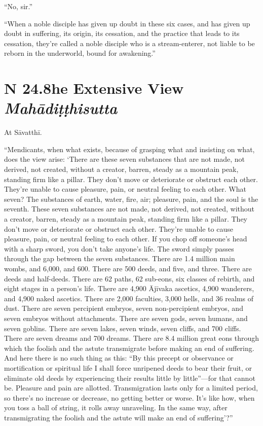 \documentclass[12pt,openany]{book}%
\newcommand*{\suttatitleacronym}[1]{\smaller[2]{#1}\vspace*{.3em}}
\newcommand*{\suttatitletranslation}[1]{\linebreak{#1}}
\newcommand*{\suttatitleroot}[1]{\linebreak\smaller[2]\itshape{#1}}
\newcommand*{\tocacronym}[1]{\hspace*{-3.3em}{#1}\quad}
\newcommand*{\toctranslation}[1]{#1}
\newcommand*{\tocroot}[1]{(\textit{#1})}
\begin{document}
“No, sir.” 

“When a noble disciple has given up doubt in these six cases, and has given up doubt in suffering, its origin, its cessation, and the practice that leads to its cessation, they’re called a noble disciple who is a stream-enterer, not liable to be reborn in the underworld, bound for awakening.” 

%
\section*{{\suttatitleacronym SN 24.8}{\suttatitletranslation The Extensive View }{\suttatitleroot Mahādiṭṭhisutta}}
\addcontentsline{toc}{section}{\tocacronym{SN 24.8} \toctranslation{The Extensive View } \tocroot{Mahādiṭṭhisutta}}

At \textsanskrit{Sāvatthī}. 

“Mendicants, when what exists, because of grasping what and insisting on what, does the view arise: ‘There are these seven substances that are not made, not derived, not created, without a creator, barren, steady as a mountain peak, standing firm like a pillar. They don’t move or deteriorate or obstruct each other. They’re unable to cause pleasure, pain, or neutral feeling to each other. What seven? The substances of earth, water, fire, air; pleasure, pain, and the soul is the seventh. These seven substances are not made, not derived, not created, without a creator, barren, steady as a mountain peak, standing firm like a pillar. They don’t move or deteriorate or obstruct each other. They’re unable to cause pleasure, pain, or neutral feeling to each other. If you chop off someone’s head with a sharp sword, you don’t take anyone’s life. The sword simply passes through the gap between the seven substances. There are 1.4 million main wombs, and 6,000, and 600. There are 500 deeds, and five, and three. There are deeds and half-deeds. There are 62 paths, 62 sub-eons, six classes of rebirth, and eight stages in a person’s life. There are 4,900 \textsanskrit{Ājīvaka} ascetics, 4,900 wanderers, and 4,900 naked ascetics. There are 2,000 faculties, 3,000 hells, and 36 realms of dust. There are seven percipient embryos, seven non-percipient embryos, and seven embryos without attachments. There are seven gods, seven humans, and seven goblins. There are seven lakes, seven winds, seven cliffs, and 700 cliffs. There are seven dreams and 700 dreams. There are 8.4 million great eons through which the foolish and the astute transmigrate before making an end of suffering. And here there is no such thing as this: “By this precept or observance or mortification or spiritual life I shall force unripened deeds to bear their fruit, or eliminate old deeds by experiencing their results little by little”—for that cannot be. Pleasure and pain are allotted. Transmigration lasts only for a limited period, so there’s no increase or decrease, no getting better or worse. It’s like how, when you toss a ball of string, it rolls away unraveling. In the same way, after transmigrating the foolish and the astute will make an end of suffering’?” 
\end{document}

